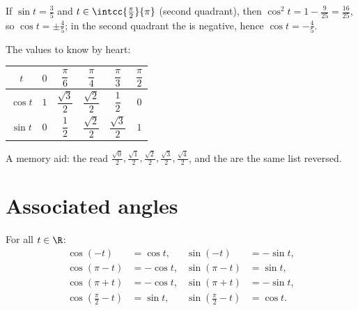 \begin{example}\label{ex:g11:trigo:identity}
If $\sin t = \frac35$ and $t \in \intcc{\frac\pi2}{\pi}$ (second
quadrant), then $\cos^2 t = 1 - \frac{9}{25} = \frac{16}{25}$, so
$\cos t = \pm\frac45$; in the second quadrant the  is negative,
hence $\cos t = -\frac45$.
\end{example}

The values to know by heart:
\begin{center}
\begin{tabular}{c|ccccc}
$t$ & $0$ & $\dfrac{\pi}{6}$ & $\dfrac{\pi}{4}$ & $\dfrac{\pi}{3}$ & $\dfrac{\pi}{2}$\\[6pt]
\hline\rule{0pt}{14pt}%
$\cos t$ & $1$ & $\dfrac{\sqrt3}{2}$ & $\dfrac{\sqrt2}{2}$ & $\dfrac12$ & $0$\\[6pt]
$\sin t$ & $0$ & $\dfrac12$ & $\dfrac{\sqrt2}{2}$ & $\dfrac{\sqrt3}{2}$ & $1$
\end{tabular}
\end{center}

\begin{remark}
A memory aid: the  read
$\frac{\sqrt0}{2}, \frac{\sqrt1}{2}, \frac{\sqrt2}{2}, \frac{\sqrt3}{2},
\frac{\sqrt4}{2}$, and the  are the same list reversed.
\end{remark}

\section{Associated angles}

\begin{proposition}\label{prop:g11:trigo:associated}
For all $t \in \R$:
\[
\begin{aligned}
\cos(-t) &= \cos t, & \sin(-t) &= -\sin t,\\
\cos(\pi - t) &= -\cos t, & \sin(\pi - t) &= \sin t,\\
\cos(\pi + t) &= -\cos t, & \sin(\pi + t) &= -\sin t,\\
\cos\left(\tfrac{\pi}{2} - t\right) &= \sin t, &
\sin\left(\tfrac{\pi}{2} - t\right) &= \cos t .
\end{aligned}
\]
\end{proposition}

